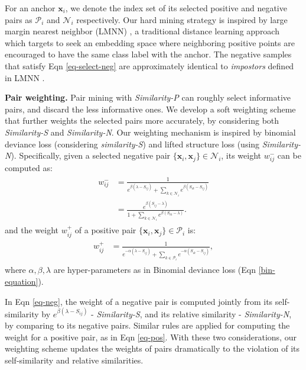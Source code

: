 \documentclass[10pt,twocolumn,letterpaper]{article}
\def\vx{{\bm{x}}}
\begin{document}
For an anchor $\vx_i$, we denote the index set of its selected positive and negative pairs as 
$\mathcal{P}_i$ and $\mathcal{N}_i$  respectively.
Our hard mining strategy is inspired by large margin nearest neighbor (LMNN) \cite{LMNN}, a traditional distance learning approach which targets to seek an embedding space where neighboring positive points are encouraged to have the same class label with the anchor.
The negative samples that satisfy Eqn \ref{eq-select-neg} are approximately identical to  {\it impostors} defined in LMNN \cite{LMNN}. 

{\bf Pair weighting.}
Pair mining with \emph{Similarity-P} can roughly select informative pairs, and discard the less informative ones. We develop a {soft} weighting scheme that further weights the selected pairs more accurately, by considering both {\it Similarity-S} and {\it Similarity-N}. Our weighting mechanism is inspired by binomial deviance loss (considering {\it similarity-S}) and lifted structure loss (using {\it Similarity-N}). Specifically, given a selected negative pair $\{\vx_i, \vx_j\} \in \mathcal{N}_i$, its weight $w_{ij}^-$ can be computed as:
\begin{align}
	\label{eq-neg}
	\begin{split}
	w^{-}_{ij} &{}=  \frac{ 1 }{ e^{\beta \left(\lambda - S_{ij} \right)}  + \sum\limits_{k \in \mathcal{N}_i} e^{\beta \left(S_{ik} - S_{ij} \right)}} \\
	 	&{}= \frac{ e^{\beta \left(S_{ij} - \lambda \right)} }{1 + \sum\limits_{k \in \mathcal{N}_i} e^{\beta \left(S_{ik} - \lambda \right)}}.
	\end{split}
\end{align}
and the weight $w_{ij}^+$ of a positive pair $\{\vx_i, \vx_j\} \in \mathcal{P}_i$ is:
\begin{align}
\label{eq-pos}
\begin{split}
w^{+}_{ij} &{}=  \frac{ 1 }{ e^{ - \alpha \left(\lambda - S_{ij} \right)}  + \sum\limits_{k \in \mathcal{P}_i} e^{ - \alpha \left(S_{ik} - S_{ij} \right)}},
\end{split}
\end{align}
where $\alpha, \beta, \lambda$ are hyper-parameters as in Binomial deviance loss (Eqn \ref{bin-equation}).

In Eqn \ref{eq-neg}, the weight of a negative pair is computed jointly from its self-similarity by $e^{\beta \left(\lambda - S_{ij} \right)}$ - {\it Similarity-S}, and its relative similarity - {\it Similarity-N}, by comparing to its negative pairs. Similar rules are applied for computing the weight for a positive pair, as in Eqn \ref{eq-pos}. With these two considerations, our weighting scheme updates the weights of pairs dramatically to the violation of its self-similarity and relative similarities. 
\end{document}

